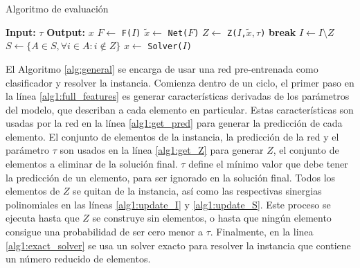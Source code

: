 \documentclass[spanish, a4paper, 12pt, openany,final]{book}
\begin{document}
\begin{algorithm}[H]
	\caption{Algoritmo de evaluación}\label{alg:general}
	\begin{algorithmic}[1]
		\Statex \textbf{Input:} $\tau$
		\Statex \textbf{Output:} $x$
		\Loop
		\State $F \gets$ \texttt{F($I$)}\label{alg1:full_features}
		\State $\tilde{x} \gets$ \texttt{Net($F$)} \label{alg1:get_pred}
		\State $Z \gets$ \texttt{Z($I$,$\tilde{x},\tau$)} \label{alg1:get_Z}
		 \label{alg1:break_condition}
		\State \textbf{break}
		\EndIf
		\State $I \gets I\setminus Z$ 								\label{alg1:update_I}
		\State $S \gets \{A \in S, \forall i \in A: i \notin Z\}$  \label{alg1:update_S}
		\EndLoop
		\State $x \gets$ \texttt{Solver($I$)} \label{alg1:exact_solver} 
	\end{algorithmic}
\end{algorithm}



El Algoritmo \ref{alg:general} se encarga de usar una red pre-entrenada como clasificador y resolver la instancia. Comienza dentro de un ciclo, el primer paso en la línea \ref{alg1:full_features} es generar características derivadas de los parámetros del modelo, que describan a cada elemento en particular. Estas características son usadas por la red en la línea \ref{alg1:get_pred} para generar la predicción de cada elemento. El conjunto de elementos de la instancia, la predicción de la red y el parámetro $\tau$ son usados en la línea \ref{alg1:get_Z} para generar $Z$, el conjunto de elementos a eliminar de la solución final. $\tau$ define el mínimo valor que debe tener la predicción de un elemento, para ser ignorado en la solución final. Todos los elementos de $Z$ se quitan de la instancia, así como las respectivas sinergias polinomiales en las líneas \ref{alg1:update_I} y \ref{alg1:update_S}. Este proceso se ejecuta hasta que $Z$ se construye sin elementos, o hasta que ningún elemento consigue una probabilidad de ser cero menor a $\tau$. Finalmente, en la linea \ref{alg1:exact_solver} se usa un solver exacto para resolver la instancia que contiene un número reducido de elementos.


\end{document}
